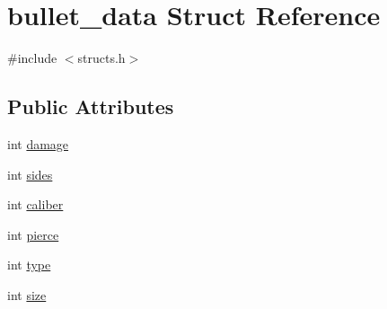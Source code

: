 \hypertarget{structbullet__data}{\section{bullet\-\_\-data Struct Reference}
\label{structbullet__data}
}


{\ttfamily \#include $<$structs.\-h$>$}

\subsection*{Public Attributes}
\begin{DoxyCompactItemize}
\item 
int \hyperlink{structbullet__data_aa012aa2cf97fb23b12232add20680e3e}{damage}
\item 
int \hyperlink{structbullet__data_a590bb73ffd2f62831761cc9ee4b25571}{sides}
\item 
int \hyperlink{structbullet__data_a4cd2f8ddc9532be2c419bd9c72d40d0c}{caliber}
\item 
int \hyperlink{structbullet__data_a510d249b12de0b08f29567e685114a62}{pierce}
\item 
int \hyperlink{structbullet__data_aa53aba68ad086bfd4ee338ca31b71e84}{type}
\item 
int \hyperlink{structbullet__data_a049788b480ffdab91337c896044676d0}{size}
\end{DoxyCompactItemize}


